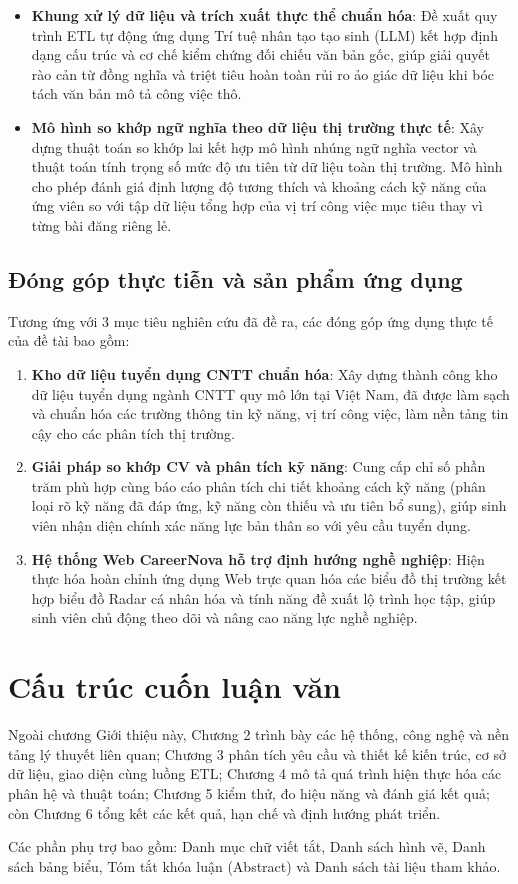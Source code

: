 \begin{itemize}
    \item \textbf{Khung xử lý dữ liệu và trích xuất thực thể chuẩn hóa}: Đề xuất quy trình ETL tự động ứng dụng Trí tuệ nhân tạo tạo sinh (LLM) kết hợp định dạng cấu trúc và cơ chế kiểm chứng đối chiếu văn bản gốc, giúp giải quyết rào cản từ đồng nghĩa và triệt tiêu hoàn toàn rủi ro ảo giác dữ liệu khi bóc tách văn bản mô tả công việc thô.
    \item \textbf{Mô hình so khớp ngữ nghĩa theo dữ liệu thị trường thực tế}: Xây dựng thuật toán so khớp lai kết hợp mô hình nhúng ngữ nghĩa vector và thuật toán tính trọng số mức độ ưu tiên từ dữ liệu toàn thị trường. Mô hình cho phép đánh giá định lượng độ tương thích và khoảng cách kỹ năng của ứng viên so với tập dữ liệu tổng hợp của vị trí công việc mục tiêu thay vì từng bài đăng riêng lẻ.
\end{itemize}

\subsection{Đóng góp thực tiễn và sản phẩm ứng dụng}

Tương ứng với 3 mục tiêu nghiên cứu đã đề ra, các đóng góp ứng dụng thực tế của đề tài bao gồm:

\begin{enumerate}
    \item \textbf{Kho dữ liệu tuyển dụng CNTT chuẩn hóa}: Xây dựng thành công kho dữ liệu tuyển dụng ngành CNTT quy mô lớn tại Việt Nam, đã được làm sạch và chuẩn hóa các trường thông tin kỹ năng, vị trí công việc, làm nền tảng tin cậy cho các phân tích thị trường.
    \item \textbf{Giải pháp so khớp CV và phân tích kỹ năng}: Cung cấp chỉ số phần trăm phù hợp cùng báo cáo phân tích chi tiết khoảng cách kỹ năng (phân loại rõ kỹ năng đã đáp ứng, kỹ năng còn thiếu và ưu tiên bổ sung), giúp sinh viên nhận diện chính xác năng lực bản thân so với yêu cầu tuyển dụng.
    \item \textbf{Hệ thống Web CareerNova hỗ trợ định hướng nghề nghiệp}: Hiện thực hóa hoàn chỉnh ứng dụng Web trực quan hóa các biểu đồ thị trường kết hợp biểu đồ Radar cá nhân hóa và tính năng đề xuất lộ trình học tập, giúp sinh viên chủ động theo dõi và nâng cao năng lực nghề nghiệp.
\end{enumerate}

\section{Cấu trúc cuốn luận văn}

Ngoài chương Giới thiệu này, Chương 2 trình bày các hệ thống, công nghệ và nền tảng lý thuyết liên quan; Chương 3 phân tích yêu cầu và thiết kế kiến trúc, cơ sở dữ liệu, giao diện cùng luồng ETL; Chương 4 mô tả quá trình hiện thực hóa các phân hệ và thuật toán; Chương 5 kiểm thử, đo hiệu năng và đánh giá kết quả; còn Chương 6 tổng kết các kết quả, hạn chế và định hướng phát triển.

Các phần phụ trợ bao gồm: Danh mục chữ viết tắt, Danh sách hình vẽ, Danh sách bảng biểu, Tóm tắt khóa luận (Abstract) và Danh sách tài liệu tham khảo.
